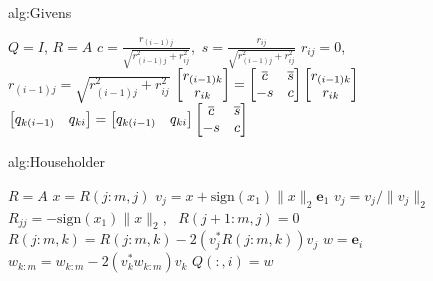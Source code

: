 \begin{alg}{alg:Givens}
    \vspace{-0.3cm}
    \begin{tcolorbox}[colback=white, colframe=gray, arc=0mm] 
        \begin{algorithmic}[1]
            \State $Q = I$, $R = A$
                    \State $c = \frac{r_{(i-1)j}}{\sqrt{r_{(i-1)j}^2 + r_{ij}^2}}$,\ $s = \frac{r_{ij}}{\sqrt{r_{(i-1)j}^2 + r_{ij}^2}}$
                    \State $r_{ij} = 0$, \ $r_{(i-1)j} = \sqrt{r_{(i-1)j}^2 + r_{ij}^2}$
                       \State $\bmatrix r_{(i-1)k} \\ r_{ik} \endbmatrix = \begin{bmatrix} \overline{c} & \overline{s} \\ -s & c \end{bmatrix} \bmatrix r_{(i-1)k} \\ r_{ik} \endbmatrix$
                    \EndFor
                    \State $\bmatrix q_{k(i-1)} & q_{ki}\endbmatrix = \bmatrix q_{k(i-1)} & q_{ki} \endbmatrix \begin{bmatrix} \overline{c} & \overline{s} \\ -s & c \end{bmatrix}$
                 \EndFor
                \EndFor
            \EndFor 
        \end{algorithmic}
    \end{tcolorbox}
    \vspace{-0.3cm}
\end{alg}

\begin{alg}{alg:Householder}
    \vspace{-0.3cm}
    \begin{tcolorbox}[colback=white, colframe=gray, arc=0mm] 
        \begin{algorithmic}[1]
            \State $R = A$
                \State $x= R(j:m,j)$
                \State $v_j = x + \text{sign}(x_1)\|x\|_2 \boldsymbol{e}_1$
                \State $v_j = v_j / \|v_j\|_2$
                \State $R_{jj} = -\text{sign}(x_1)\|x\|_2$, \ $R(j+1:m,j) = 0$
                    \State $R(j:m,k) = R(j:m,k) - 2(v_j^*R(j:m,k))v_j$
                \EndFor
            \EndFor 
                \State $w = \boldsymbol{e}_i$
                    \State $w_{k:m} = w_{k:m} - 2(v_k^*w_{k:m})v_k$
                \EndFor
                \State $Q(:,i) = w$
            \EndFor
        \end{algorithmic}
    \end{tcolorbox}
    \vspace{-0.3cm}
\end{alg}

